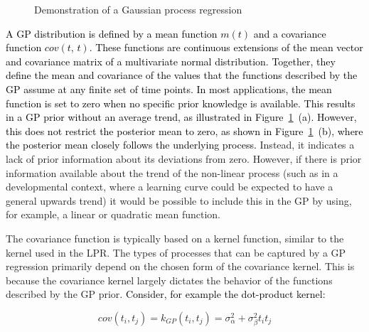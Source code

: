 \documentclass[man, floatsintext]{apa7}
\begin{document}
\begin{figure}[!t]
  \caption{Demonstration of a Gaussian process regression}
  \label{fig:gp_dem}
\end{figure}

\textcolor{black}{
  A GP distribution is defined by a mean function $m(t)$ and a covariance
  function $cov(t, \, t)$. These functions are continuous extensions of the
  mean vector and covariance matrix of a multivariate normal distribution.
  Together, they define the mean and covariance of the values that the
  functions described by the GP assume at any finite set of time points.
  In most applications, the mean function is set to zero when no specific prior
  knowledge is available. This results in a GP prior without an average trend,
  as illustrated in Figure~\ref{fig:gp_dem}~(a). However, this does not
  restrict the posterior mean to zero, as shown in Figure~\ref{fig:gp_dem}~(b),
  where the posterior mean closely follows the underlying process. } Instead,
it indicates a lack of prior information about its deviations from zero.
However, if there is prior information available about the trend of the
non-linear process (such as in a developmental context, where a learning
curve could be expected to have a general upwards trend) it would be possible
to include this in the GP by using, for example, a linear or quadratic mean
function.

The covariance function is typically based on a kernel function, similar to the
kernel used in the LPR\@. The types of processes that can be captured by a GP
regression primarily depend on the chosen form of the covariance kernel. This
is because the covariance kernel largely dictates the behavior of the functions
described by the GP prior\@. \textcolor{black}{Consider, for example the
  dot-product kernel:}

\begin{equation}\label{eq:dot_prod_kernel}
  cov(t_i, t_j) = k_{GP}(t_i, t_j) = \sigma_\alpha^2 + \sigma_\beta^2 t_i t_j
\end{equation}
\end{document}
